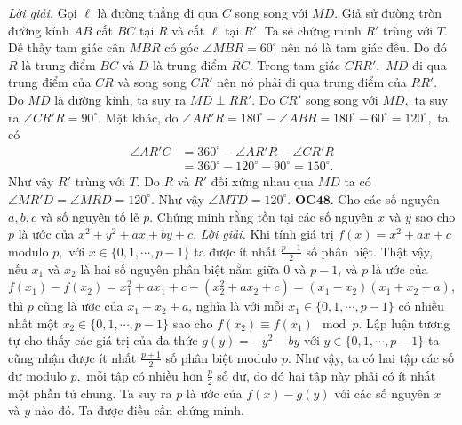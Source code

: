 \begin{multicols}{2}
\begin{figure}[H]
		\vspace*{-5pt}
	\end{figure}
	\textit{Lời giải.} Gọi $\ell$ là đường thẳng đi qua $C$ song song với $MD.$ Giả sử đường tròn đường kính $AB$ cắt $BC$ tại $R$ và cắt $\ell$ tại $R'.$  Ta sẽ chứng minh  $R'$ trùng với  $T.$ 
	\vskip 0.1cm
	Dễ thấy tam giác cân $MBR$ có góc $\angle MBR=60^\circ$ nên nó là tam giác đều. Do đó $R$ là trung điểm $BC$ và $D$ là trung điểm $RC.$ Trong tam giác $CRR',$ $MD$ đi qua trung điểm của $CR$ và song song $CR'$ nên nó phải đi qua trung điểm của $RR'.$ Do $MD$ là đường kính, ta suy ra $MD\perp RR'.$ Do $CR'$ song song với $MD,$ ta suy ra $\angle CR'R=90^\circ.$ 
	\vskip 0.1cm
	Mặt khác, do $\angle AR'R=180^\circ - \angle ABR= 180^\circ-60^\circ=120^\circ,$ ta có 
	\begin{align*}
		\angle AR'C&=360^\circ-\angle AR'R - \angle CR'R \\
		&= 360^\circ -120^\circ - 90^\circ=150^\circ.
	\end{align*}
	Như vậy $R'$ trùng với $T.$ Do $R$ và $R'$ đối xứng nhau qua $MD$ ta có $\angle MR'D=\angle MRD= 120^\circ.$  Như vậy $\angle MTD=120^\circ.$  
	\vskip 0.1cm
	{\bf\color{cackithi} OC$\pmb{48.}$} Cho các số nguyên $a, b, c$ và số nguyên tố lẻ $p.$ Chứng minh rằng tồn tại các số nguyên $x$ và $y$ sao cho $p$ là ước của $x^2 + y^2 + ax + by + c.$      
	\vskip 0.1cm
	\textit{Lời giải.}
	Khi tính giá trị  $f(x)=x^2+ax+c$ modulo $p,$ với $x \in \{0, 1, \cdots, p - 1\}$ ta được ít nhất $\frac{p+1}{2}$  số phân biệt. Thật vậy, nếu $x_1$ và $x_2$ là hai số nguyên phân biệt nằm giữa $0$ và $p-1$, và $p$ là ước của  $f(x_1)-f(x_2) = x_1^2 +ax_1+c-(x_2^2 +ax_2+c) = (x_1-x_2)(x_1+x_2+a)$,
	thì $p$ cũng là ước của $x_1 + x_2 + a$, nghĩa là với mỗi $x_1\in \{0, 1, \cdots, p - 1\}$ có nhiều nhất
	một $x_2\in \{0, 1, \cdots, p - 1\}$  sao cho $f(x_2)\equiv f(x_1) \mod p.$ 
	\vskip 0.1cm
	Lập luận tương tự cho thấy các giá trị của đa thức $g(y) = -y^2 - by$ với  $y \in \{0, 1, \cdots, p - 1\}$ ta cũng nhận được ít nhất $\frac{p+1}{2}$ số phân biệt modulo $p.$ Như vậy, ta có hai tập các số dư modulo $p,$  mỗi tập có nhiều hơn $\frac{p}{2}$ số dư, do đó hai tập này phải có ít nhất một phần tử chung. Ta suy ra $p$ là ước của $f(x) - g(y)$ với các số nguyên $x$ và $y$ nào đó. Ta được điều cần chứng minh.  

\end{multicols}
